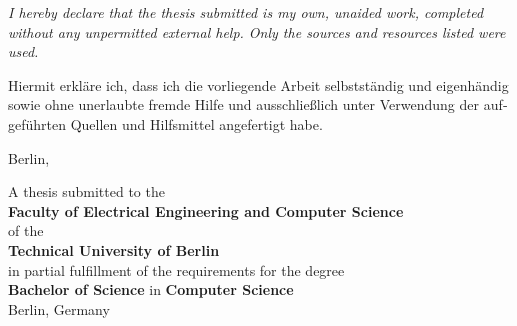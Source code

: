 \let\origparident\parindent
\setlength{\parindent}{0pt}

{\LARGE
\vspace*{2cm}
\textbf{\thetitle}
}

\cleardoublepage

\begin{minipage}[c][\textheight]{.7\textwidth}
{\itshape
I hereby declare that the thesis submitted is my own, unaided work, completed without any
unpermitted external help. Only the sources and resources listed were used.
\vspace{1em}
}

\begin{otherlanguage}{ngerman}
Hiermit erkläre ich, dass ich die vorliegende Arbeit selbstständig und eigenhändig
sowie ohne unerlaubte fremde Hilfe und ausschließlich unter Verwendung der aufgeführten
Quellen und Hilfsmittel angefertigt habe.
\vspace{2em}
\end{otherlanguage}

Berlin,

\vspace{3em}
\dotfill{}
\end{minipage}


\cleardoublepage

\vspace*{2cm}

{\Huge
\textbf{\thetitle}
}

\vspace{2cm}

{\large
\textbf{\theauthor}
}

\vspace*{\fill}

A thesis submitted to the\\
\textbf{Faculty of Electrical Engineering and Computer Science}\\
of the\\
\textbf{Technical University of Berlin}\\
in partial fulfillment of the requirements for the degree\\
\textbf{Bachelor of Science} in \textbf{Computer Science}\\[1em]

Berlin, Germany\\
\thedate\\[1em]

\newpage

\vspace*{\fill}

